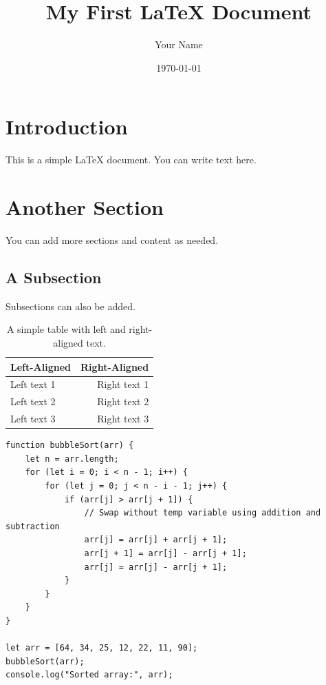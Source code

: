 \documentclass{article}  %
\begin{document}

\title{My First LaTeX Document}  %
\author{Your Name}               %
\date{\today}                    %

\maketitle                       %

\section{Introduction}           %
This is a simple LaTeX document. You can write text here.

\section{Another Section}
You can add more sections and content as needed.

\subsection{A Subsection}
Subsections can also be added.

\begin{table}[h]
\centering
\begin{tabular}{|l|r|}
\hline
\textbf{Left-Aligned} & \textbf{Right-Aligned} \\
\hline
Left text 1 & Right text 1 \\
Left text 2 & Right text 2 \\
Left text 3 & Right text 3 \\
\hline
\end{tabular}
\caption{A simple table with left and right-aligned text.}
\end{table}

\begin{verbatim}
function bubbleSort(arr) {
    let n = arr.length;
    for (let i = 0; i < n - 1; i++) {
        for (let j = 0; j < n - i - 1; j++) {
            if (arr[j] > arr[j + 1]) {
                // Swap without temp variable using addition and subtraction
                arr[j] = arr[j] + arr[j + 1];
                arr[j + 1] = arr[j] - arr[j + 1];
                arr[j] = arr[j] - arr[j + 1];
            }
        }
    }
}

let arr = [64, 34, 25, 12, 22, 11, 90];
bubbleSort(arr);
console.log("Sorted array:", arr);
\end{verbatim}
\end{document}
